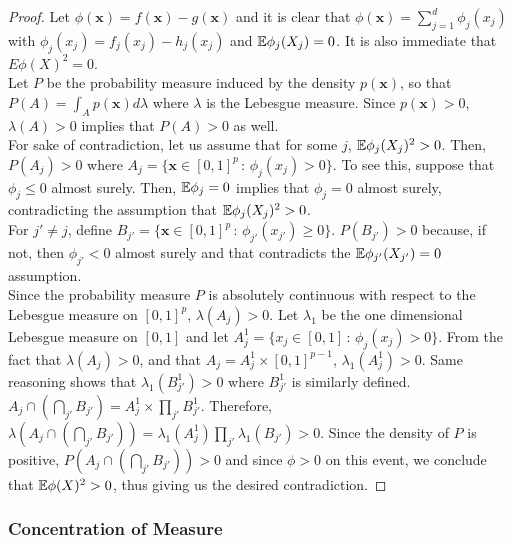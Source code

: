 \documentclass[12pt,pdftex,aos,noinfoline,addressasfootnote]{imsart}
\begin{document}
\begin{proof}

Let $\phi(\mathbf{x}) = f(\mathbf{x}) - g(\mathbf{x})$ and it is clear that $\phi(\mathbf{x}) = \sum_{j=1}^d \phi_j(x_j)$ with $\phi_j(x_j) = f_j(x_j) - h_j(x_j)$ and ${\mathbb E} \phi_j(X_j) = 0$. It is also immediate that $E \phi(X)^2 = 0$. \\

Let $P$ be the probability measure induced by the density $p(\mathbf{x})$, so that $P(A) = \int_A p(\mathbf{x}) d\lambda$ where $\lambda$ is the Lebesgue measure. Since $p(\mathbf{x}) > 0$, $\lambda(A) > 0$ implies that $P(A) > 0$ as well. \\

For sake of contradiction, let us assume that for some $j$, ${\mathbb E} \phi_j(X_j)^2 > 0$. Then, $P(A_j ) > 0$ where $A_j = \{ \mathbf{x} \in [0,1]^p \,:\, \phi_j(x_j) > 0 \}$. To see this, suppose that $\phi_j \leq 0$ almost surely. Then, ${\mathbb E} \phi_j = 0$ implies that $\phi_j = 0$ almost surely, contradicting the assumption that ${\mathbb E} \phi_j(X_j)^2 > 0$.\\

For $j' \neq j$, define $B_{j'} = \{ \mathbf{x} \in [0,1]^p \,:\, \phi_{j'}(x_{j'}) \geq 0 \}$. $P( B_{j'} ) > 0$ because, if not, then $\phi_{j'} < 0$ almost surely and that contradicts the ${\mathbb E} \phi_{j'}(X_{j'}) = 0$ assumption. \\

Since the probability measure $P$ is absolutely continuous with respect to the Lebesgue measure on $[0, 1]^p$, $\lambda (A_j) > 0$. Let $\lambda_1$ be the one dimensional Lebesgue measure on $[0,1]$ and let $A^1_j = \{ x_j \in [0,1] \,:\, \phi_j(x_j) > 0\}$. From the fact that $\lambda(A_j) > 0$, and that $A_j = A^1_j \times [0,1]^{p-1}$, $\lambda_1(A^1_j) > 0$. Same reasoning shows that $\lambda_1(B^1_{j'}) > 0$ where $B^1_{j'}$ is similarly defined.\\

$A_j \cap \left( \bigcap_{j'} B_{j'} \right) = A^1_j \times \prod_{j'} B^1_{j'}$. Therefore, $\lambda ( A_j \cap \left( \bigcap_{j'} B_{j'} \right) ) = \lambda_1(A^1_j)  \prod_{j'} \lambda_1 (B_{j'}) > 0$. Since the density of $P$ is positive, $P( A_j \cap \left( \bigcap_{j'} B_{j'} \right) ) > 0$ and since $\phi > 0$ on this event, we conclude that ${\mathbb E} \phi(X)^2 > 0$, thus giving us the desired contradiction.

\end{proof}

\subsubsection{Concentration of Measure}
\end{document}
